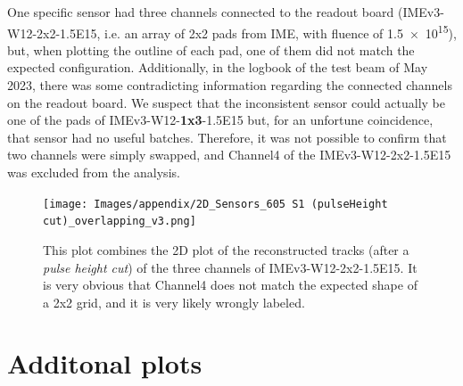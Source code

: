 One specific sensor had three channels connected to the readout board (IMEv3-W12-2x2-1.5E15, i.e. an array of 2x2 pads from IME, with fluence of \qty{1.5e15}{\neutroneq}), but, when plotting the outline of each pad, one of them did not match the expected configuration. Additionally, in the logbook of the test beam of May 2023, there was some contradicting information regarding the connected channels on the readout board. We suspect that the inconsistent sensor could actually be one of the pads of IMEv3-W12-\textbf{1x3}-1.5E15 but, for an unfortune coincidence, that sensor had no useful batches. %
Therefore, it was not possible to confirm that two channels were simply swapped, and Channel4 of the IMEv3-W12-2x2-1.5E15 was excluded from the analysis.


\begin{figure}[h!tbp]
    \centering
    \texttt{[image: Images/appendix/2D\_Sensors\_605 S1 (pulseHeight cut)\_overlapping\_v3.png]}
    \caption{This plot combines the 2D plot of the reconstructed tracks (after a \textit{pulse height cut}) of the three channels of IMEv3-W12-2x2-1.5E15. It is very obvious that Channel4 does not match the expected shape of a 2x2 grid, and it is very likely wrongly labeled.}
    \label{fig:mislabeled_sensor}
\end{figure}

\section{Additonal plots}\label{sec:additional_plots}

